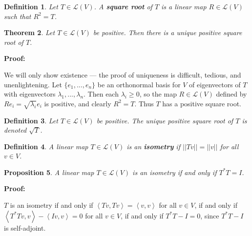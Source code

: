 \documentclass{article}
\theoremstyle{colontheorem}
\newtheorem{theorem}{Theorem}[section]
\newtheorem{proposition}[theorem]{Proposition}
\newtheorem{definition}[theorem]{Definition}
\newenvironment{Theorem}
{
	\begin{mdframed}[backgroundcolor=TheoremOrange!10]
	\begin{theorem}
}
{
	\end{theorem}
	\end{mdframed}
	
	\vspace{.15in}
}
\newenvironment{Proposition}
{
	\begin{mdframed}[backgroundcolor=TheoremOrange!10]
	\begin{proposition}
}
{
	\end{proposition}
	\end{mdframed}
	
	\vspace{.15in}
}
\newenvironment{Def}
{
	\begin{mdframed}[backgroundcolor=DefGreen!10]
	\begin{definition}
}
{
	\end{definition}
	\end{mdframed}
	
	\vspace{.15in}
}
\newenvironment{Proof}
{
	\vspace{-.3in}
	
	\begin{mdframed}[backgroundcolor=ProofPurple!10]
	\textbf{Proof:}%
}
{
	\end{mdframed}
	
	\vspace{.15in}
}
\begin{document}
\begin{Def}
	
	Let $T \in \mathcal{L}(V)$. A \textbf{square root} of $T$ is a linear map $R \in \mathcal{L}(V)$ such that $R^2 = T$.
	
\end{Def}



\begin{Theorem}
	
	Let $T \in \mathcal{L}(V)$ be positive. Then there is a unique positive square root of $T$.
	
\end{Theorem}



\begin{Proof}
	We will only show existence --- the proof of uniqueness is difficult, tedious, and unenlightening. Let $\{e_1, ..., e_n\}$ be an orthonormal basis for $V$ of eigenvectors of $T$ with eigenvectors $\lambda_1, ..., \lambda_n$. Then each $\lambda_i \geq 0$, so the map $R \in \mathcal{L}(V)$ defined by $Re_i = \sqrt{\lambda_i} e_i$ is positive, and clearly $R^2 = T$. Thus $T$ has a positive square root.
			
\end{Proof}



\begin{Def}
	
	Let $T \in \mathcal{L}(V)$ be positive. The unique positive square root of $T$ is denoted $\sqrt{T}$.
	
\end{Def}



\begin{Def}
	
	A linear map $T \in \mathcal{L}(V)$ is an \textbf{isometry} if $||Tv|| = ||v||$ for all $v \in V$.
	
\end{Def}



\begin{Proposition}
	
	A linear map $T \in \mathcal{L}(V)$ is an isometry if and only if $T^* T = I$.
	
\end{Proposition}



\begin{Proof}
	$T$ is an isometry if and only if $\left< Tv, Tv \right> = \left< v, v \right>$ for all $v \in V$, if and only if $\left< T^* T v, v \right> - \left< Iv, v \right> = 0$ for all $v \in V$, if and only if $T^* T - I = 0$, since $T^* T - I$ is self-adjoint.
	
\end{Proof}
\end{document}

